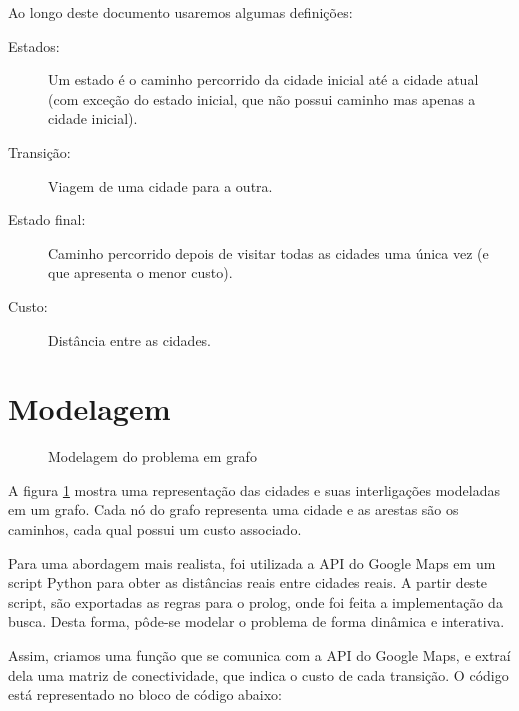 \documentclass[12pt,a4paper]{article}
\begin{document}
Ao longo deste documento usaremos algumas definições:
\begin{description}
  \item 
    [Estados:] Um estado é o caminho percorrido da cidade inicial até a cidade atual (com exceção do estado inicial, que não possui caminho mas apenas a cidade inicial).

  \item[Transição:] Viagem de uma cidade para a outra.

  \item [Estado final:] Caminho percorrido depois de visitar todas as cidades uma única vez (e que apresenta o menor custo).

\item [Custo:] Distância entre as cidades.

\end{description}
	
\newpage

\section{Modelagem}

\begin{figure}[htpb]
  \centering
  
  \caption{Modelagem do problema em grafo}
  \label{fig:1}
\end{figure}

A figura \ref{fig:1} mostra uma representação das cidades e suas interligações modeladas em um grafo. Cada nó do grafo representa uma cidade e as arestas são os caminhos, cada qual possui um custo associado.

Para uma abordagem mais realista, foi utilizada a API do Google Maps em um script Python para obter as distâncias reais entre cidades reais. A partir deste script, são exportadas as regras para o prolog, onde foi feita a implementação da busca. Desta forma, pôde-se modelar o problema de forma dinâmica e interativa.

Assim, criamos uma função que se comunica com a API do Google Maps, e extraí dela uma matriz de conectividade, que indica o custo de cada transição. O código está representado no bloco de código abaixo:

\begin{mdframed}[linecolor=black, topline=true, bottomline=true,
  leftline=false, rightline=false, backgroundcolor=yellow!10!white]
\inputminted[tabsize=2,linenos=true,fontsize=\footnotesize,breaklines=true,breakafter=format]{python}{../DistanceMatrix.py}
\end{mdframed}
\end{document}
